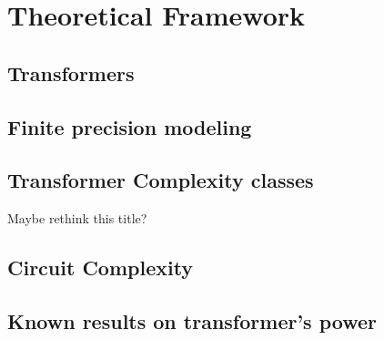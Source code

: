 \chapter{Theoretical Framework}

\section{Transformers}





\section{Finite precision modeling}\label{repr}


\section{Transformer Complexity classes}{\color{orange} Maybe rethink this title?}



\section{Circuit Complexity}\label{circuits}



\section{Known results on transformer's power}



